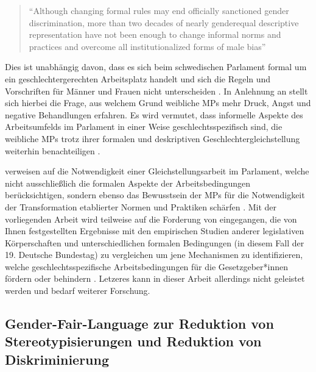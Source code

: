\documentclass[12pt, 
    twoside=false, 
    bibliography=totoc, 
    numbers=endperiod, 
    headings=normal, 
    toc=chapterentrydotfill
    ]{scrbook}
\begin{document}
\citereset
\begin{quote}
    \enquote{Although changing formal rules may end officially sanctioned gender discrimination, more than two decades of nearly genderequal descriptive representation have not been enough to change informal norms and practices and overcome all institutionalized forms of male bias} \parencite[211]{erikson_2018}
\end{quote}

 Dies ist unabhängig davon, dass es sich beim schwedischen Parlament formal um ein geschlechtergerechten Arbeitsplatz handelt und sich die Regeln und Vorschriften für Männer und Frauen nicht unterscheiden \parencite[211]{erikson_2018}. In Anlehnung an \citeauthor{erikson_2018} stellt sich hierbei die Frage, aus welchem Grund weibliche MPs mehr Druck, Angst und negative Behandlungen erfahren. Es wird vermutet, dass informelle Aspekte des Arbeitsumfelds im Parlament in einer Weise geschlechtsspezifisch sind, die weibliche MPs trotz ihrer formalen und deskriptiven Geschlechtergleichstellung weiterhin benachteiligen \parencite[210]{erikson_2018}.

\citeauthor{erikson_2018} verweisen auf die Notwendigkeit einer Gleichstellungsarbeit im Parlament, welche nicht ausschließlich die formalen Aspekte der Arbeitsbedingungen berücksichtigen, sondern ebenso das Bewusstsein der MPs für die Notwendigkeit der Transformation etablierter Normen und Praktiken schärfen \parencite[211]{erikson_2018}.
Mit der vorliegenden Arbeit wird teilweise auf die Forderung von\citeauthor{erikson_2018} eingegangen, die von Ihnen festgestellten Ergebnisse mit den empirischen Studien anderer legislativen Körperschaften und unterschiedlichen formalen Bedingungen (in diesem Fall der 19. Deutsche Bundestag) zu vergleichen um jene Mechanismen zu identifizieren, welche geschlechtsspezifische Arbeitsbedingungen für die Gesetzgeber*innen fördern oder behindern \parencite[211]{erikson_2018}. Letzeres kann in dieser Arbeit allerdings nicht geleistet werden und bedarf weiterer Forschung. 


\subsection{Gender-Fair-Language zur Reduktion von Stereotypisierungen und Reduktion von Diskriminierung}

\end{document}

